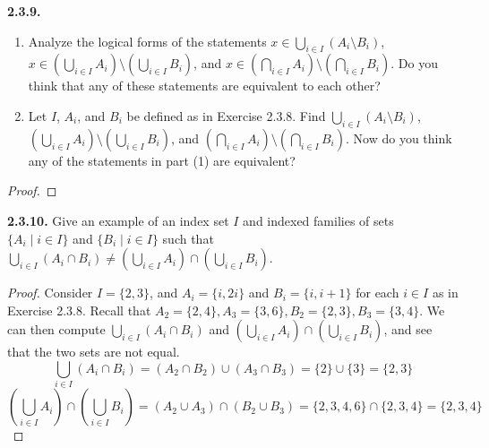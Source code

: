 \documentclass[12pt]{amsart}
\newenvironment{statement}[1]{\smallskip\noindent\color[rgb]{.6627, .3529, .6314} {\bf #1.}}{}
\theoremstyle{definition}
\theoremstyle{remark}
\begin{document}
\begin{statement}{2.3.9}
\begin{enumerate}
	\item Analyze the logical forms of the statements
	$x \in \bigcup_{i \in I} (A_i \setminus B_i)$,
	$x \in \left( \bigcup_{i \in I} A_i \right) \setminus \left( \bigcup_{i \in I} B_i \right)$, and
	$x \in \left( \bigcap_{i \in I} A_i \right) \setminus \left( \bigcap_{i \in I} B_i \right)$.
	Do you think that any of these statements are equivalent to each other?
	
	\item Let $I$, $A_i$, and $B_i$ be defined as in Exercise 2.3.8.
	Find $\bigcup_{i \in I} (A_i \setminus B_i)$,
	$\left( \bigcup_{i \in I} A_i \right) \setminus \left( \bigcup_{i \in I} B_i \right)$, and
	$\left( \bigcap_{i \in I} A_i \right) \setminus \left( \bigcap_{i \in I} B_i \right)$.
	Now do you think any of the statements in part (1) are equivalent?
\end{enumerate}
\end{statement}

\begin{proof}
\end{proof}


\begin{statement}{2.3.10}
Give an example of an index set $I$ and indexed families of sets
$\{ A_i \mid i \in I \}$ and $\{ B_i \mid i \in I \}$
such that
$\bigcup_{i \in I} (A_i \cap B_i) \neq
\left( \bigcup_{i \in I} A_i \right) \cap \left( \bigcup_{i \in I} B_i \right)$.
\end{statement}

\begin{proof}
Consider $I = \{ 2, 3 \}$, and $A_i = \{ i, 2i \}$ and $B_i = \{ i, i + 1 \}$ for each $i \in I$
as in Exercise 2.3.8.
Recall that $A_2 = \{ 2, 4 \}, A_3 = \{ 3, 6 \}, B_2 = \{ 2, 3 \}, B_3 = \{ 3, 4 \}$.
We can then compute $\bigcup_{i \in I} (A_i \cap B_i)$ and
$\left( \bigcup_{i \in I} A_i \right) \cap \left( \bigcup_{i \in I} B_i \right)$,
and see that the two sets are not equal.
\begin{equation*}
	\bigcup_{i \in I} (A_i \cap B_i)
	= (A_2 \cap B_2) \cup (A_3 \cap B_3)
	= \{ 2 \} \cup \{ 3 \}
	= \{ 2, 3 \}
\end{equation*}
\begin{equation*}
	\left( \bigcup_{i \in I} A_i \right) \cap \left( \bigcup_{i \in I} B_i \right)
	= (A_2 \cup A_3) \cap (B_2 \cup B_3)
	= \{ 2, 3, 4, 6 \} \cap \{ 2, 3, 4 \}
	= \{ 2, 3, 4 \}
\end{equation*}
\end{proof}
\end{document}
